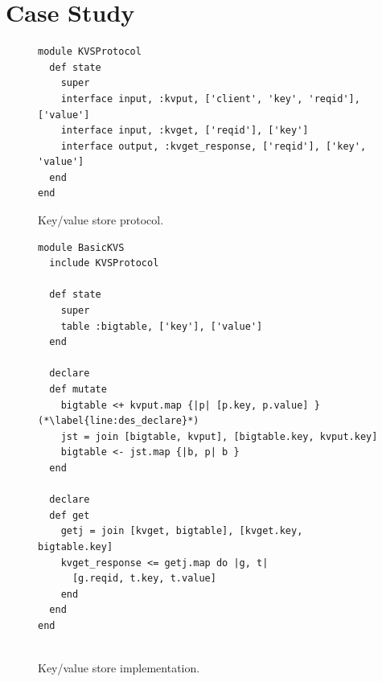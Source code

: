 \section{Case Study}
\label{sec:case}





\begin{figure}[t]
\begin{scriptsize}
\begin{lstlisting}
module KVSProtocol
  def state
    super
    interface input, :kvput, ['client', 'key', 'reqid'], ['value']
    interface input, :kvget, ['reqid'], ['key']
    interface output, :kvget_response, ['reqid'], ['key', 'value']
  end
end

\end{lstlisting}
\vspace{-10pt}
\caption{Key/value store protocol.}
\label{fig:kvs-proto}
\end{scriptsize}
\vspace{-2pt}
\end{figure}

\begin{figure}[t]
\begin{scriptsize}
\begin{lstlisting}
module BasicKVS
  include KVSProtocol

  def state
    super
    table :bigtable, ['key'], ['value']
  end

  declare
  def mutate
    bigtable <+ kvput.map {|p| [p.key, p.value] } (*\label{line:des_declare}*)
    jst = join [bigtable, kvput], [bigtable.key, kvput.key] 
    bigtable <- jst.map {|b, p| b }
  end

  declare
  def get
    getj = join [kvget, bigtable], [kvget.key, bigtable.key]
    kvget_response <= getj.map do |g, t|
      [g.reqid, t.key, t.value]
    end
  end
end


\end{lstlisting}
\vspace{-10pt}
\caption{Key/value store implementation.}
\label{fig:kvs-impl}
\end{scriptsize}
\vspace{-2pt}
\end{figure}

